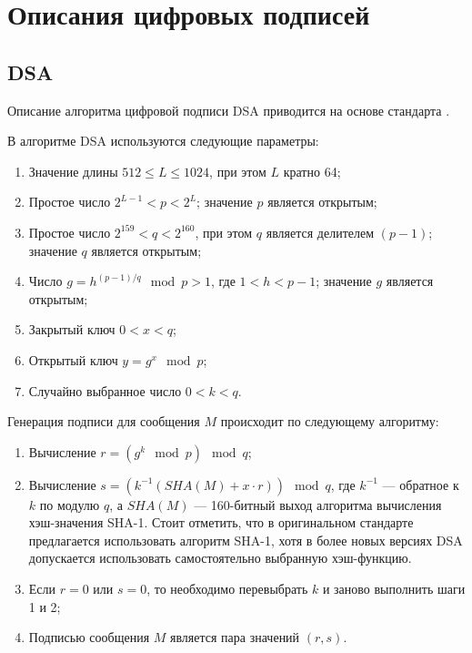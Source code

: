 \documentclass{./civarticle}
\begin{document}
\section{Описания цифровых подписей}

\subsection{DSA}

Описание алгоритма цифровой подписи DSA приводится на основе стандарта \cite{dsa}.

В алгоритме DSA используются следующие параметры:

\begin{enumerate}
    \item Значение длины $512 \leq L \leq 1024$, при этом $L$ кратно 64; 
    \item Простое число $2^{L-1} < p < 2^L$; значение $p$ является открытым;
    \item Простое число $2^{159} < q < 2^{160}$, при этом $q$ является делителем $(p-1)$; значение $q$ является открытым;
    \item Число $g = h^{(p-1)/q} \mod p > 1$, где $1 < h < p-1$; значение $g$ является открытым;
    \item Закрытый ключ $0 < x < q$;
    \item Открытый ключ $y = g^x \mod p$;
    \item Случайно выбранное число $0 < k < q$.
\end{enumerate}

Генерация подписи для сообщения $M$ происходит по следующему алгоритму:

\begin{enumerate}
    \item Вычисление $r = (g^k \mod p) \mod q$;
    \item Вычисление $s = (k^{-1}(SHA(M) + x\cdot r)) \mod q$, где $k^{-1}$ --- обратное к $k$ по модулю $q$, а $SHA(M)$ --- 160-битный выход алгоритма вычисления хэш-значения SHA-1. Стоит отметить, что в оригинальном стандарте предлагается использовать алгоритм SHA-1, хотя в более новых версиях DSA допускается использовать самостоятельно выбранную хэш-функцию.
    \item Если $r = 0$ или $s = 0$, то необходимо перевыбрать $k$ и заново выполнить шаги 1 и 2;
    \item Подписью сообщения $M$ является пара значений $(r, s)$.
\end{enumerate}
\end{document}
